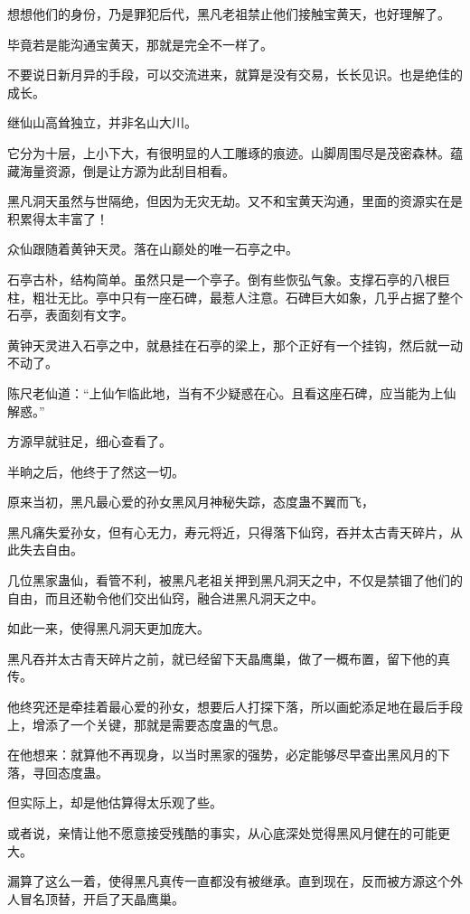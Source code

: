\begin{this_body}
想想他们的身份，乃是罪犯后代，黑凡老祖禁止他们接触宝黄天，也好理解了。

毕竟若是能沟通宝黄天，那就是完全不一样了。

不要说日新月异的手段，可以交流进来，就算是没有交易，长长见识。也是绝佳的成长。

继仙山高耸独立，并非名山大川。

它分为十层，上小下大，有很明显的人工雕琢的痕迹。山脚周围尽是茂密森林。蕴藏海量资源，倒是让方源为此刮目相看。

黑凡洞天虽然与世隔绝，但因为无灾无劫。又不和宝黄天沟通，里面的资源实在是积累得太丰富了！

众仙跟随着黄钟天灵。落在山巅处的唯一石亭之中。

石亭古朴，结构简单。虽然只是一个亭子。倒有些恢弘气象。支撑石亭的八根巨柱，粗壮无比。亭中只有一座石碑，最惹人注意。石碑巨大如象，几乎占据了整个石亭，表面刻有文字。

黄钟天灵进入石亭之中，就悬挂在石亭的梁上，那个正好有一个挂钩，然后就一动不动了。

陈尺老仙道：“上仙乍临此地，当有不少疑惑在心。且看这座石碑，应当能为上仙解惑。”

方源早就驻足，细心查看了。

半晌之后，他终于了然这一切。

原来当初，黑凡最心爱的孙女黑风月神秘失踪，态度蛊不翼而飞，

黑凡痛失爱孙女，但有心无力，寿元将近，只得落下仙窍，吞并太古青天碎片，从此失去自由。

几位黑家蛊仙，看管不利，被黑凡老祖关押到黑凡洞天之中，不仅是禁锢了他们的自由，而且还勒令他们交出仙窍，融合进黑凡洞天之中。

如此一来，使得黑凡洞天更加庞大。

黑凡吞并太古青天碎片之前，就已经留下天晶鹰巢，做了一概布置，留下他的真传。

他终究还是牵挂着最心爱的孙女，想要后人打探下落，所以画蛇添足地在最后手段上，增添了一个关键，那就是需要态度蛊的气息。

在他想来：就算他不再现身，以当时黑家的强势，必定能够尽早查出黑风月的下落，寻回态度蛊。

但实际上，却是他估算得太乐观了些。

或者说，亲情让他不愿意接受残酷的事实，从心底深处觉得黑风月健在的可能更大。

漏算了这么一着，使得黑凡真传一直都没有被继承。直到现在，反而被方源这个外人冒名顶替，开启了天晶鹰巢。


\end{this_body}
